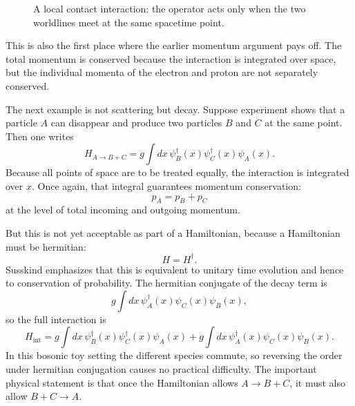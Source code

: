 \begin{figure}
\centering
{}
\caption{A local contact interaction: the operator acts only when the two worldlines meet at the same spacetime point.}
\end{figure}

This is also the first place where the earlier momentum argument pays off. The total momentum is conserved because the interaction is integrated over space, but the individual momenta of the electron and proton are not separately conserved.

The next example is not scattering but decay. Suppose experiment shows that a particle \(A\) can disappear and produce two particles \(B\) and \(C\) at the same point. Then one writes
\begin{equation}
H_{A\to B+C}=g\int dx\,\psi_B^\dagger(x)\psi_C^\dagger(x)\psi_A(x).
\end{equation}
Because all points of space are to be treated equally, the interaction is integrated over \(x\). Once again, that integral guarantees momentum conservation:
\begin{equation}
p_A=p_B+p_C
\end{equation}
at the level of total incoming and outgoing momentum.

But this is not yet acceptable as part of a Hamiltonian, because a Hamiltonian must be hermitian:
\begin{equation}
H=H^\dagger.
\end{equation}
Susskind emphasizes that this is equivalent to unitary time evolution and hence to conservation of probability. The hermitian conjugate of the decay term is
\begin{equation}
g\int dx\,\psi_A^\dagger(x)\psi_C(x)\psi_B(x),
\end{equation}
so the full interaction is
\begin{equation}
H_{\mathrm{int}}
=
g\int dx\,\psi_B^\dagger(x)\psi_C^\dagger(x)\psi_A(x)
+
g\int dx\,\psi_A^\dagger(x)\psi_C(x)\psi_B(x).
\end{equation}
In this bosonic toy setting the different species commute, so reversing the order under hermitian conjugation causes no practical difficulty. The important physical statement is that once the Hamiltonian allows \(A\to B+C\), it must also allow \(B+C\to A\).

